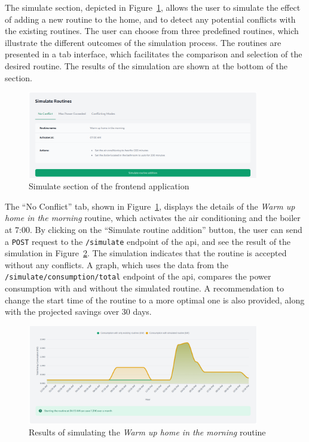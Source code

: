 The simulate section, depicted in Figure~\ref{fig:frontend_simulate}, allows the user to simulate the effect of adding a new routine to the home, and to detect any potential conflicts with the existing routines. The user can choose from three predefined routines, which illustrate the different outcomes of the simulation process. The routines are presented in a tab interface, which facilitates the comparison and selection of the desired routine. The results of the simulation are shown at the bottom of the section.

\begin{figure}
    \centering
    \includegraphics[width=0.9\textwidth]{images/frontend/simulate.png}
    \caption{Simulate section of the frontend application}%
    \label{fig:frontend_simulate}
\end{figure}

The ``No Conflict'' tab, shown in Figure~\ref{fig:frontend_simulate}, displays the details of the \textit{Warm up home in the morning} routine, which activates the air conditioning and the boiler at 7:00. By clicking on the ``Simulate routine addition'' button, the user can send a \texttt{POST} request to the \texttt{/simulate} endpoint of the \acrshort{api}, and see the result of the simulation in Figure~\ref{fig:frontend_no_conflict_result}. The simulation indicates that the routine is accepted without any conflicts. A graph, which uses the data from the \texttt{/simulate/consumption/total} endpoint of the \acrshort{api}, compares the power consumption with and without the simulated routine. A recommendation to change the start time of the routine to a more optimal one is also provided, along with the projected savings over 30 days.

\begin{figure}
    \centering
    \includegraphics[width=0.9\textwidth]{images/frontend/no_conflict_result.png}
    \caption{Results of simulating the \textit{Warm up home in the morning} routine}%
    \label{fig:frontend_no_conflict_result}
\end{figure}

